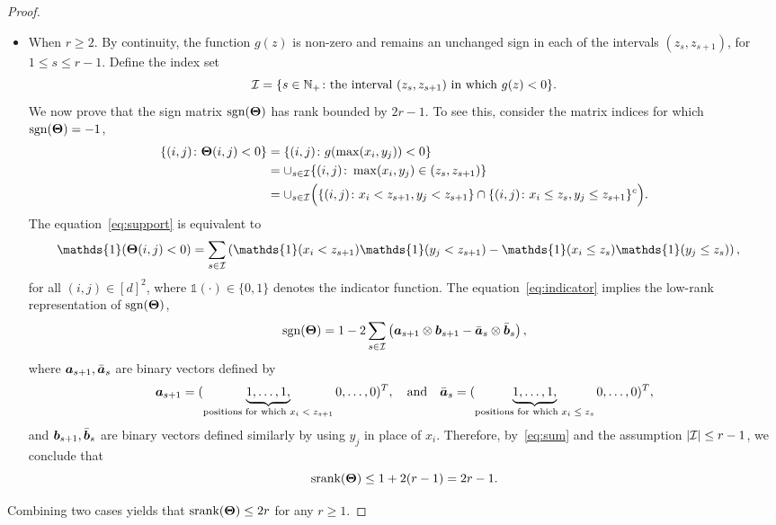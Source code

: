 \documentclass[11pt]{article}
\newcommand*{\KeepStyleUnderBrace}[1]{%
\mathop{%
\mathchoice
{\underbrace{\displaystyle#1}}%
{\underbrace{\textstyle#1}}%
{\underbrace{\scriptstyle#1}}%
{\underbrace{\scriptscriptstyle#1}}%
}\limits
}
\theoremstyle{plain}
\theoremstyle{definition}
\def\sign{\textup{sgn}}
\def\srank{\textup{srank}}
\begin{document}
\begin{proof}
\begin{itemize}
\item When $r\geq 2$. By continuity, the function $g(z)$ is non-zero and remains an unchanged sign in each of the intervals $(z_s, z_{s+1})$, for $1\leq s\leq r-1$. Define the index set 
\[
\mathcal{I}=\{s\in\mathbb{N}_{+}\colon \text{the interval $(z_s, z_{s+1})$ in which $g(z)<0$}\}.
\] 
We now prove that the sign matrix $\sign(\mTheta)$ has rank bounded by $2r-1$. To see this, consider the matrix indices for which $\sign(\mTheta)=-1$,
\begin{align}\label{eq:support}
\{(i,j)\colon \bm{\Theta}(i,j) <0 \} & = \{(i,j) \colon g(\max(x_i,y_j))<0\} \notag \\
&=\cup_{s\in \mathcal{I}} \{(i,j)\colon \max(x_i,y_j)\in(z_s,z_{s+1})\}\notag\\
&=\cup_{s\in \mathcal{I}}\Big( \{(i,j)\colon x_{i}< z_{s+1}, y_j<z_{s+1}\} \cap \{(i,j)\colon x_{i}\leq z_{s}, y_j\leq z_{s+1}\}^c\Big).
\end{align}
The equation~\eqref{eq:support} is equivalent to 
\begin{align}\label{eq:indicator}
\mathds{1}(\mTheta(i,j)< 0)&
=\sum_{s\in \tI}\left(  \mathds{1}(x_{i}< z_{s+1}) \mathds{1}(y_{j}< z_{s+1})- \mathds{1}(x_{i}\leq z_{s})\mathds{1}(y_{j}\leq z_{s})\right),
\end{align}
for all $(i,j)\in[d]^2$, where $\mathds{1}(\cdot)\in\{0,1\}$ denotes the indicator function. The equation~\eqref{eq:indicator} implies the low-rank representation of $\sign(\mTheta)$,
\begin{equation}\label{eq:sum}
\sign(\mTheta)=1-2\sum_{s\in \tI } \left(\ma_{s+1}\otimes \mb_{s+1} - \bar \ma_s\otimes \bar \mb_s\right),
\end{equation}
where $\bm{a}_{s+1}, \bar {\bm{a}}_{s}$ are binary vectors defined by
\[
\ma_{s+1}=(\KeepStyleUnderBrace{1,\ldots,1,}_{\text{positions for which $x_{i}<z_{s+1}$}}0,\ldots,0)^T,\quad \text{and}\quad
\bar \ma_s=(\KeepStyleUnderBrace{1,\ldots,1,}_{\text{positions for which $x_{i}\leq z_{s}$}}0,\ldots,0)^T,
\]
and $\bm{b}_{s+1}, \bar {\bm{b}}_{s}$ are binary vectors defined similarly by using $y_j$ in place of $x_i$. 
Therefore, by~\eqref{eq:sum} and the assumption $|\mathcal{I}|\leq r-1$, we conclude that 
\[
\srank(\mTheta)\leq 1+2(r-1)=2r-1.
\]
\end{itemize}
Combining two cases yields that $\srank(\mTheta)\leq 2r$ for any $r\geq 1$.
\end{proof}
\end{document}
